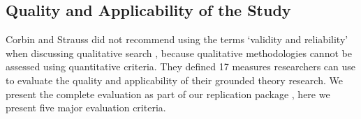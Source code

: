 






\subsection{Quality and Applicability of the Study}
Corbin and Strauss did not recommend using the terms `validity and reliability' when discussing qualitative search \cite{corbin2014gt}, because qualitative methodologies cannot be assessed using quantitative criteria. They defined 17 measures researchers can use to evaluate the quality and applicability of their grounded theory research. We present the complete evaluation as part of our replication package \cite{website:replication-package}, here we present five major evaluation criteria.

